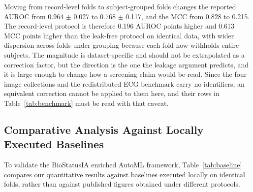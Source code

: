 \documentclass[conference]{IEEEtran}
\begin{document}
\begin{table}[htbp]
\caption{Effect of Subject Grouping on the UCI Parkinson Voice Benchmark (195 Recordings, 32 Subjects). Same Data, Same Model Space, Same Seed; Only the Fold Assignment Differs.}
\label{tab:vazamento}
\centering
{}
\end{table}

Moving from record-level folds to subject-grouped folds changes the reported AUROC from 0.964 $\pm$ 0.027 to 0.768 $\pm$ 0.117, and the MCC from 0.828 to 0.215. The record-level protocol is therefore 0.196 AUROC points higher and 0.613 MCC points higher than the leak-free protocol on identical data, with wider dispersion across folds under grouping because each fold now withholds entire subjects. The magnitude is dataset-specific and should not be extrapolated as a correction factor, but the direction is the one the leakage argument predicts, and it is large enough to change how a screening claim would be read. Since the four image collections and the redistributed ECG benchmark carry no identifiers, an equivalent correction cannot be applied to them here, and their rows in Table~\ref{tab:benchmark} must be read with that caveat.

\subsection{Comparative Analysis Against Locally Executed Baselines}
To validate the BioStatusIA enriched AutoML framework, Table~\ref{tab:baseline} compares our quantitative results against baselines executed locally on identical folds, rather than against published figures obtained under different protocols.
\end{document}
